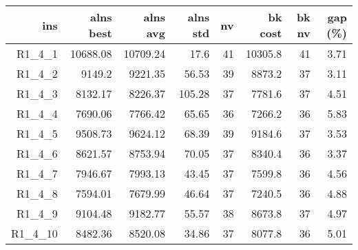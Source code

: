   \begin{table}[caption={Kết quả đo với tập HG\_R\_1\_4 400 yêu cầu}, label=exp:HGR14]
    \centering
    \begin{tabular}{rrrrrrrr}
    \hline
    ins & alns best & alns avg & alns std & nv & bk cost & bk nv & gap (\%) \\ \hline
    R1\_4\_1 & 10688.08 & 10709.24 & 17.6 & 41 & 10305.8 & 41 & 3.71 \\ \hline
    R1\_4\_2 & 9149.2 & 9221.35 & 56.53 & 39 & 8873.2 & 37 & 3.11 \\ \hline
    R1\_4\_3 & 8132.17 & 8226.37 & 105.28 & 37 & 7781.6 & 37 & 4.51 \\ \hline
    R1\_4\_4 & 7690.06 & 7766.42 & 65.65 & 36 & 7266.2 & 36 & 5.83 \\ \hline
    R1\_4\_5 & 9508.73 & 9624.12 & 68.39 & 39 & 9184.6 & 37 & 3.53 \\ \hline
    R1\_4\_6 & 8621.57 & 8753.94 & 70.05 & 37 & 8340.4 & 36 & 3.37 \\ \hline
    R1\_4\_7 & 7946.67 & 7993.13 & 43.45 & 37 & 7599.8 & 36 & 4.56 \\ \hline
    R1\_4\_8 & 7594.01 & 7679.99 & 46.64 & 37 & 7240.5 & 36 & 4.88 \\ \hline
    R1\_4\_9 & 9104.48 & 9182.77 & 55.57 & 38 & 8673.8 & 37 & 4.97 \\ \hline
    R1\_4\_10 & 8482.36 & 8520.08 & 34.86 & 37 & 8077.8 & 36 & 5.01 \\ \hline
    \end{tabular}
  \end{table}

